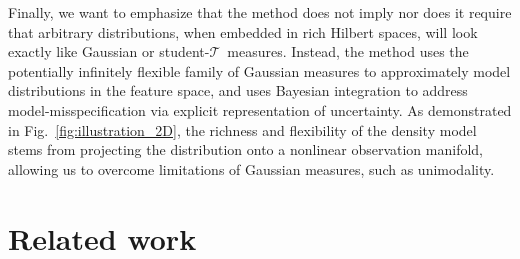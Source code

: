 \documentclass[twoside]{article}
\newcommand{\studentt}{student-$\mathcal{T}$\ }
\newcommand{\varconc}{\alpha}
\newcommand{\meanconc}{\beta}
\begin{document}
\begin{figure*}[t]
 \begin{center}
 \end{center}
 \caption{\label{fig:fantasy}Fantasy data drawn from a two dimensional kernel \studentt model with SE kernel. The  length-scale $\ell=1$ (\emph{bars below panels}) and $\meanconc=0.01$ are fixed, $\varconc$ varies between $0.01$ and $10$ (\textbf{A} to \textbf{C}). Panels show 50 points (\emph{blue dots}) drawn from the generative model and the predictive density (\emph{gray level}) of the $51^{\mbox{st}}$ draw.}
\end{figure*}

Finally, we want to emphasize that the method does not imply nor does it require that arbitrary distributions, when embedded in rich Hilbert spaces, will look exactly like Gaussian or \studentt measures. Instead, the method uses the potentially infinitely flexible family of Gaussian measures to approximately model distributions in the feature space, and uses Bayesian integration to address model-misspecification via explicit representation of uncertainty. As demonstrated in Fig.~\ref{fig:illustration_2D}, the richness and flexibility of the density model stems from projecting the distribution onto a nonlinear observation manifold, allowing us to overcome limitations of Gaussian measures, such as unimodality.

\section{Related work}
\end{document}
